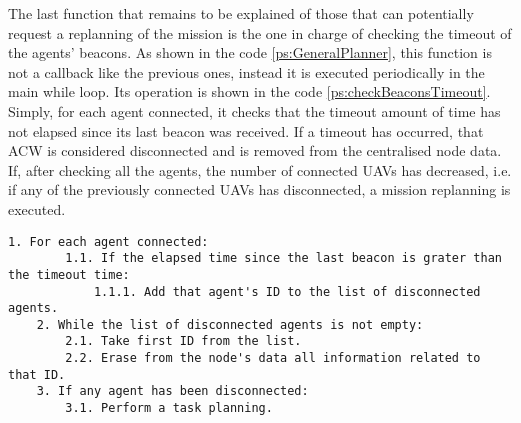The last function that remains to be explained of those that can potentially request a replanning of the mission is the one in charge of checking the timeout of the agents' beacons. As shown in the code \ref{ps:GeneralPlanner}, this function is not a callback like the previous ones, instead it is executed periodically in the main while loop. Its operation is shown in the code \ref{ps:checkBeaconsTimeout}. Simply, for each agent connected, it checks that the timeout amount of time has not elapsed since its last beacon was received. If a timeout has occurred, that \gls{ACW} is considered disconnected and is removed from the centralised node data. If, after checking all the agents, the number of connected \glspl{UAV} has decreased, i.e. if any of the previously connected \glspl{UAV} has disconnected, a mission replanning is executed.

\begin{lstlisting}[caption={Beacons' timeout check function}, breaklines=true, label=ps:checkBeaconsTimeout]
	1. For each agent connected:
		1.1. If the elapsed time since the last beacon is grater than the timeout time:
			1.1.1. Add that agent's ID to the list of disconnected agents.
	2. While the list of disconnected agents is not empty:
		2.1. Take first ID from the list.
		2.2. Erase from the node's data all information related to that ID.
	3. If any agent has been disconnected:
		3.1. Perform a task planning.
\end{lstlisting}

